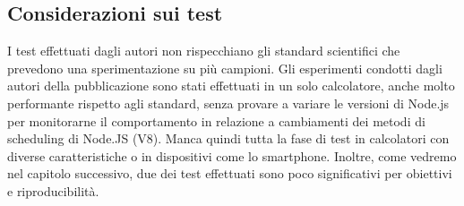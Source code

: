 \documentclass[conference]{IEEEtran}
\begin{document}
\subsection{Considerazioni sui test}
I test effettuati dagli autori non rispecchiano gli standard scientifici che prevedono una sperimentazione su più campioni. Gli esperimenti condotti dagli autori della pubblicazione sono stati effettuati in un solo calcolatore, anche molto performante rispetto agli standard, senza provare a variare le versioni di Node.js per monitorarne il comportamento in relazione a cambiamenti dei metodi di scheduling di Node.JS (V8). Manca quindi tutta la fase di test in calcolatori con diverse caratteristiche o in dispositivi come lo smartphone.
\newline
Inoltre, come vedremo nel capitolo successivo, due dei test effettuati sono poco significativi per obiettivi e riproducibilità.
\end{document}
